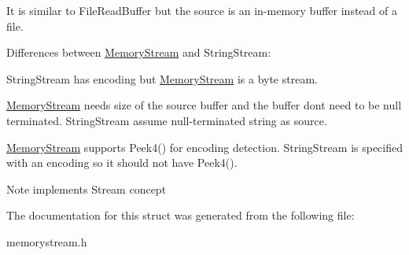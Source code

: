 It is similar to File\+Read\+Buffer but the source is an in-\/memory buffer instead of a file.

Differences between \hyperlink{a00224}{Memory\+Stream} and String\+Stream\+:
\begin{DoxyEnumerate}
\item String\+Stream has encoding but \hyperlink{a00224}{Memory\+Stream} is a byte stream.
\item \hyperlink{a00224}{Memory\+Stream} needs size of the source buffer and the buffer don\textquotesingle{}t need to be null terminated. String\+Stream assume null-\/terminated string as source.
\item \hyperlink{a00224}{Memory\+Stream} supports Peek4() for encoding detection. String\+Stream is specified with an encoding so it should not have Peek4(). \begin{DoxyNote}{Note}
implements Stream concept 
\end{DoxyNote}

\end{DoxyEnumerate}

The documentation for this struct was generated from the following file\+:\begin{DoxyCompactItemize}
\item 
memorystream.\+h\end{DoxyCompactItemize}
